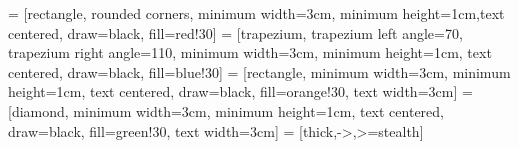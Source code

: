 \usepackage{graphicx}
\usepackage[headheight=0pt,headsep=0pt]{geometry}
\addtolength{\topmargin}{-30pt}
\addtolength{\textheight}{120pt}
\usepackage{fancyhdr}
\usepackage[utf8]{inputenc}
\usepackage[ngerman]{babel}
\usepackage[T1]{fontenc}
\usepackage{color}   %
\usepackage{hyperref}
\hypersetup{
    colorlinks=true, %
    linktoc=all,     %
    linkcolor=black,  %
}

\usepackage{listings}


\usepackage{tikz}
\usetikzlibrary{shapes.geometric, arrows, arrows.meta, calc, positioning, quotes}
 = [rectangle, rounded corners, minimum width=3cm, minimum height=1cm,text centered, draw=black, fill=red!30]
 = [trapezium, trapezium left angle=70, trapezium right angle=110, minimum width=3cm, minimum height=1cm, text centered, draw=black, fill=blue!30]
 = [rectangle, minimum width=3cm, minimum height=1cm, text centered, draw=black, fill=orange!30, text width=3cm]
 = [diamond, minimum width=3cm, minimum height=1cm, text centered, draw=black, fill=green!30, text width=3cm]
 = [thick,->,>=stealth]
\usetikzlibrary{arrows}